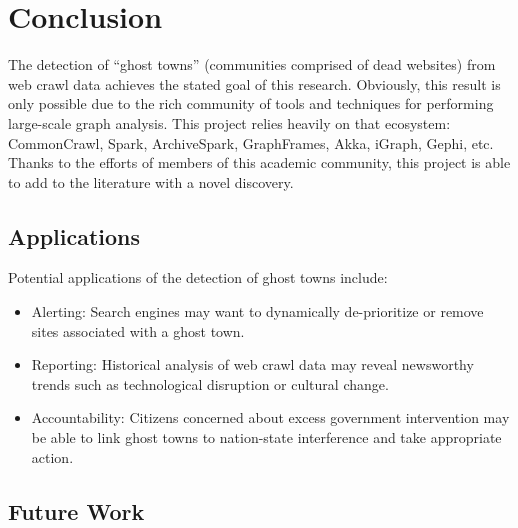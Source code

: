 \documentclass[conference]{IEEEtran}
\begin{document}
\section{Conclusion}

The detection of ``ghost towns'' (communities comprised of dead websites) from web crawl data achieves the stated goal of this research. Obviously, this result is only possible due to the rich community of tools and techniques for performing large-scale graph analysis. This project relies heavily on that ecosystem: CommonCrawl, Spark, ArchiveSpark, GraphFrames, Akka, iGraph, Gephi, etc. Thanks to the efforts of members of this academic community, this project is able to add to the literature with a novel discovery.

\subsection{Applications}

Potential applications of the detection of ghost towns include:
\begin{itemize}
	\item Alerting: Search engines may want to dynamically de-prioritize or remove sites associated with a ghost town.
	\item Reporting: Historical analysis of web crawl data may reveal newsworthy trends such as technological disruption or cultural change.
	\item Accountability: Citizens concerned about excess government intervention may be able to link ghost towns to nation-state interference and take appropriate action.
\end{itemize}

\subsection{Future Work}
\end{document}
